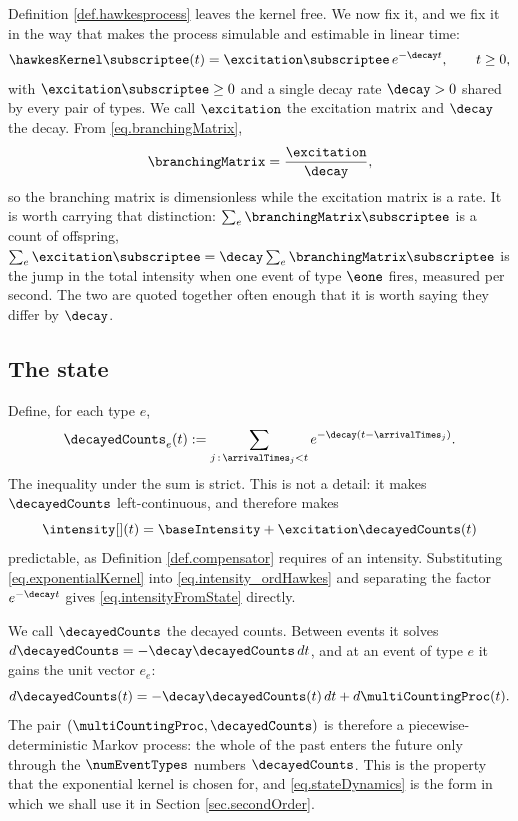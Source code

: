 Definition \ref{def.hawkesprocess} leaves the kernel free.
We now fix it, and we fix it in the way that makes the process simulable and estimable
in linear time:
\begin{equation}\label{eq.exponentialKernel}
 \hawkesKernel\subscriptee(t) = \excitation\subscriptee \, e^{-\decay t},
 \qquad t \geq 0,
\end{equation}
with $\excitation\subscriptee \geq 0$ and a single decay rate $\decay > 0$ shared by every pair
of types.
We call $\excitation$ the excitation matrix and $\decay$ the decay.
From \eqref{eq.branchingMatrix},
\begin{equation}\label{eq.GammaIsAOverBeta}
 \branchingMatrix = \frac{\excitation}{\decay},
\end{equation}
so the branching matrix is dimensionless while the excitation matrix is a rate.
It is worth carrying that distinction:
$\sum_e \branchingMatrix\subscriptee$ is a count of offspring,
$\sum_e \excitation\subscriptee = \decay \sum_e \branchingMatrix\subscriptee$ is
the jump in the total intensity when one event of type $\eone$ fires,
measured per second.
The two are quoted together often enough that it is worth saying they differ by $\decay$.

\subsection{The state}

Define, for each type $e$,
\begin{equation}\label{eq.decayedCounts}
 \decayedCounts_e(t) := \sum_{j \, : \, \arrivalTimes_{j} < t} e^{-\decay (t - \arrivalTimes_{j})}.
\end{equation}
The inequality under the sum is strict.
This is not a detail: it makes $\decayedCounts$ left-continuous,
and therefore makes
\begin{equation}\label{eq.intensityFromState}
 \intensity[ ](t) = \baseIntensity + \excitation \decayedCounts(t)
\end{equation}
predictable, as Definition \ref{def.compensator} requires of an intensity.
Substituting \eqref{eq.exponentialKernel} into \eqref{eq.intensity_ordHawkes}
and separating the factor $e^{-\decay t}$ gives \eqref{eq.intensityFromState} directly.

We call $\decayedCounts$ the decayed counts.
Between events it solves $d\decayedCounts = -\decay \decayedCounts \, dt$,
and at an event of type $e$ it gains the unit vector $e_e$:
\begin{equation}\label{eq.stateDynamics}
 d\decayedCounts(t) = -\decay \decayedCounts(t) \, dt + d\multiCountingProc(t).
\end{equation}
The pair $(\multiCountingProc, \decayedCounts)$ is therefore a piecewise-deterministic Markov
process:
the whole of the past enters the future only through the $\numEventTypes$ numbers
$\decayedCounts$.
This is the property that the exponential kernel is chosen for,
and \eqref{eq.stateDynamics} is the form in which we shall use it in
Section \ref{sec.secondOrder}.

